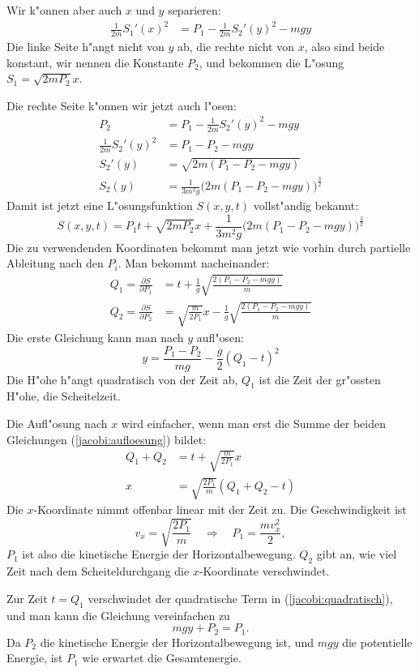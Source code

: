 Wir k"onnen aber auch $x$ und $y$ separieren:
\begin{align*}
\frac1{2m}S_1'(x)^2&=P_1-\frac1{2m}S_2'(y)^2-mgy
\end{align*}
Die linke Seite h"angt nicht von $y$ ab, die rechte nicht von $x$, also sind
beide konstant, wir nennen die Konstante $P_2$, und bekommen
die L"osung $S_1=\sqrt{2mP_2} x$.

Die rechte Seite k"onnen wir jetzt auch l"osen:
\begin{align*}
P_2&=
P_1-\frac1{2m}S_2'(y)^2-mgy
\\
\frac1{2m}S_2'(y)^2
&=
P_1-P_2-mgy
\\
S_2'(y)&=\sqrt{
2m(P_1-P_2-mgy)
}
\\
S_2(y)
&=
\frac1{3m^2g}\bigl(2m(P_1-P_2-mgy)\bigr)^{\frac32}
\end{align*}
Damit ist jetzt eine L"osungsfunktion $S(x,y,t)$ vollst"andig
bekannt:
\[
S(x,y,t)=P_1t+\sqrt{2mP_2}x +
\frac1{3m^2g}\bigl(2m(P_1-P_2-mgy)\bigr)^{\frac32}
\]
Die zu verwendenden Koordinaten bekommt man jetzt wie vorhin durch
partielle Ableitung nach den $P_i$. Man bekommt nacheinander:
\begin{equation}
\begin{aligned}
Q_1=\frac{\partial S}{\partial P_1}
&=
t+
\frac1{g}\sqrt{\frac{2(P_1-P_2-mgy)}{m}}
\\
Q_2=\frac{\partial S}{\partial P_2}
&=
\sqrt{\frac{m}{2P_1}}x
-
\frac1{g}\sqrt{\frac{2(P_1-P_2-mgy)}{m}}
\end{aligned}
\label{jacobi:aufloesung}
\end{equation}
Die erste Gleichung kann man nach $y$ aufl"osen:
\begin{equation}
y=
\frac{P_1-P_2}{mg}-\frac{g}{2}(Q_1-t)^2
\label{jacobi:quadratisch}
\end{equation}
Die H"ohe h"angt quadratisch von der Zeit ab, $Q_1$ ist die Zeit
der gr"ossten H"ohe, die Scheitelzeit.

Die Aufl"osung nach $x$ wird einfacher, wenn man erst die Summe der beiden
Gleichungen (\ref{jacobi:aufloesung}) bildet:
\begin{align*}
Q_1+Q_2&=t+\sqrt{\frac{m}{2P_1}}x\\
x&=\sqrt{\frac{2P_1}{m}}(Q_1+Q_2-t)
\end{align*}
Die $x$-Koordinate nimmt offenbar linear mit der Zeit zu. Die
Geschwindigkeit ist
\[
v_x=\sqrt{\frac{2P_1}{m}}\quad\Rightarrow\quad P_1=\frac{mv_x^2}2,
\]
$P_1$ ist also die kinetische Energie der Horizontalbewegung.
$Q_2$ gibt an, wie viel Zeit nach dem Scheiteldurchgang die $x$-Koordinate
verschwindet.

Zur Zeit $t=Q_1$ verschwindet der quadratische Term in
(\ref{jacobi:quadratisch}), und man kann die Gleichung vereinfachen
zu 
\[
mgy + P_2=P_1.
\]
Da $P_2$ die kinetische Energie der Horizontalbewegung ist, und $mgy$
die potentielle Energie, ist $P_1$ wie erwartet die Gesamtenergie.

